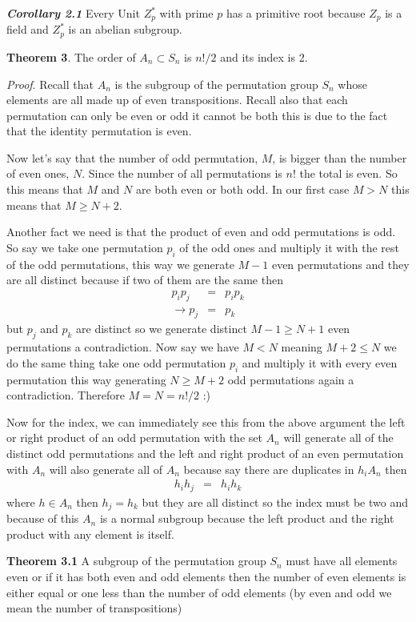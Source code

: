 \documentclass[aps,preprint,preprintnumbers,nofootinbib,showpacs,prd]{revtex4-1}
\newcommand{\nbea}{\begin{eqnarray*}}
\newcommand{\neea}{\end{eqnarray*}}
\begin{document}
{\textit{\textbf{Corollary 2.1}}} Every Unit $Z^*_p$ with prime $p$ has a primitive root because $Z_p$ is a field and $Z^*_p$ is an abelian subgroup.

{\bf Theorem 3}. The order of $A_n \subset S_n$ is $n!/2$ and its index is 2.

{\it Proof}. Recall that $A_n$ is the subgroup of the permutation group $S_n$ whose elements are all made up of even transpositions. Recall also that each permutation can only be even or odd it cannot be both this is due to the fact that the identity permutation is even.

Now let's say that the number of odd permutation, $M$, is bigger than the number of even ones, $N$. Since the number of all permutations is $n!$ the total is even. So this means that $M$ and $N$ are both even or both odd. In our first case $M > N$ this means that $M \ge N + 2$.

Another fact we need is that the product of even and odd permutations is odd. So say we take one permutation $p_i$ of the odd ones and multiply it with the rest of the odd permutations, this way we generate $M-1$ even permutations and they are all distinct because if two of them are the same then 
%
\nbea
p_ip_j & = & p_ip_k \\
\to p_j & = & p_k
\neea
%
but $p_j$ and $p_k$ are distinct so we generate distinct $M-1 \ge N+1$ even permutations a contradiction. Now say we have $M < N$ meaning $M + 2 \le N$ we do the same thing take one odd permutation $p_i$ and multiply it with every even permutation this way generating $N \ge M + 2$ odd permutations again a contradiction. Therefore $M = N = n!/2$ :) 

Now for the index, we can immediately see this from the above argument the left or right product of an odd permutation with the set $A_n$ will generate all of the distinct odd permutations and the left and right product of an even permutation with $A_n$ will also generate all of $A_n$ because say there are duplicates in $h_i A_n$ then 
%
\nbea
h_i h_j & = & h_i h_k
\neea
%
where $h \in A_n$ then $h_j = h_k$ but they are all distinct so the index must be two and because of this $A_n$ is a normal subgroup because the left product and the right product with any element is itself.

{\bf Theorem 3.1} A subgroup of the permutation group $S_n$ must have all elements even or if it has both even and odd elements then the number of even elements is either equal or one less than the number of odd elements (by even and odd we mean the number of transpositions)
\end{document}
